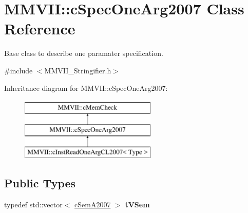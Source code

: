 \hypertarget{classMMVII_1_1cSpecOneArg2007}{}\section{M\+M\+V\+II\+:\+:c\+Spec\+One\+Arg2007 Class Reference}
\label{classMMVII_1_1cSpecOneArg2007}


Base class to describe one paramater specification.  




{\ttfamily \#include $<$M\+M\+V\+I\+I\+\_\+\+Stringifier.\+h$>$}

Inheritance diagram for M\+M\+V\+II\+:\+:c\+Spec\+One\+Arg2007\+:\begin{figure}[H]
\begin{center}
\leavevmode
\includegraphics[height=3.000000cm]{classMMVII_1_1cSpecOneArg2007}
\end{center}
\end{figure}
\subsection*{Public Types}
\begin{DoxyCompactItemize}
\item 
typedef std\+::vector$<$ \hyperlink{classMMVII_1_1cSemA2007}{c\+Sem\+A2007} $>$ {\bfseries t\+V\+Sem}\hypertarget{classMMVII_1_1cSpecOneArg2007_a54b27f452eb86d70eccc567bbaf91bf5}{}\label{classMMVII_1_1cSpecOneArg2007_a54b27f452eb86d70eccc567bbaf91bf5}

\end{DoxyCompactItemize}
